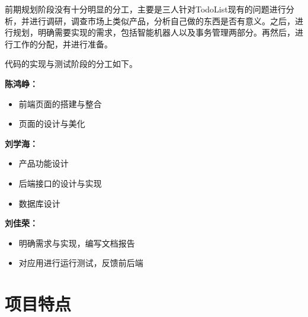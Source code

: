 \documentclass[logo,reportComp]{thesis}
\begin{document}
前期规划阶段没有十分明显的分工，主要是三人针对TodoList现有的问题进行分析，并进行调研，调查市场上类似产品，分析自己做的东西是否有意义。之后，进行规划，明确需要实现的需求，包括智能机器人以及事务管理两部分。再然后，进行工作的分配，并进行准备。

代码的实现与测试阶段的分工如下。

\textbf{陈鸿峥：}
\begin{itemize}
\item 前端页面的搭建与整合
\item 页面的设计与美化
\end{itemize}

\textbf{刘学海：}
\begin{itemize}
\item 产品功能设计
\item 后端接口的设计与实现
\item 数据库设计
\end{itemize}

\textbf{刘佳荣：}
\begin{itemize}
\item 明确需求与实现，编写文档报告
\item 对应用进行运行测试，反馈前后端
\end{itemize}

\section{项目特点}
\end{document}
